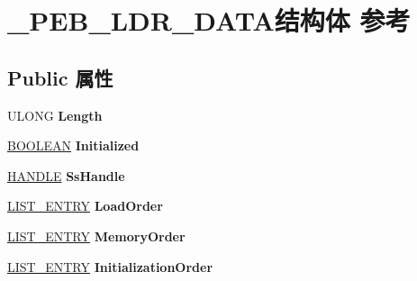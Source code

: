 \hypertarget{struct___p_e_b___l_d_r___d_a_t_a}{}\section{\+\_\+\+P\+E\+B\+\_\+\+L\+D\+R\+\_\+\+D\+A\+T\+A结构体 参考}
\label{struct___p_e_b___l_d_r___d_a_t_a}
\subsection*{Public 属性}
\begin{DoxyCompactItemize}
\item 
\mbox{\label{struct___p_e_b___l_d_r___d_a_t_a_a9737f04179d6f149682175c7ec6615e0}} 
U\+L\+O\+NG {\bfseries Length}
\item 
\mbox{\label{struct___p_e_b___l_d_r___d_a_t_a_ac358a40ebd21443f32f6586a7453f8b0}} 
\hyperlink{_processor_bind_8h_a112e3146cb38b6ee95e64d85842e380a}{B\+O\+O\+L\+E\+AN} {\bfseries Initialized}
\item 
\mbox{\label{struct___p_e_b___l_d_r___d_a_t_a_a86328021b42b24f5e6096893a54ec949}} 
\hyperlink{interfacevoid}{H\+A\+N\+D\+LE} {\bfseries Ss\+Handle}
\item 
\mbox{\label{struct___p_e_b___l_d_r___d_a_t_a_a0aade704f2358013e6f850e1f3c65941}} 
\hyperlink{struct___l_i_s_t___e_n_t_r_y}{L\+I\+S\+T\+\_\+\+E\+N\+T\+RY} {\bfseries Load\+Order}
\item 
\mbox{\label{struct___p_e_b___l_d_r___d_a_t_a_a71c27bafb7cc15174721fcca9ae4feb4}} 
\hyperlink{struct___l_i_s_t___e_n_t_r_y}{L\+I\+S\+T\+\_\+\+E\+N\+T\+RY} {\bfseries Memory\+Order}
\item 
\mbox{\label{struct___p_e_b___l_d_r___d_a_t_a_ab22a6b711cf61514e463db1f90ee51f0}} 
\hyperlink{struct___l_i_s_t___e_n_t_r_y}{L\+I\+S\+T\+\_\+\+E\+N\+T\+RY} {\bfseries Initialization\+Order}
\item 
\mbox{\label{struct___p_e_b___l_d_r___d_a_t_a_a86328021b42b24f5e6096893a54ec949}} 

\end{DoxyCompactItemize}
